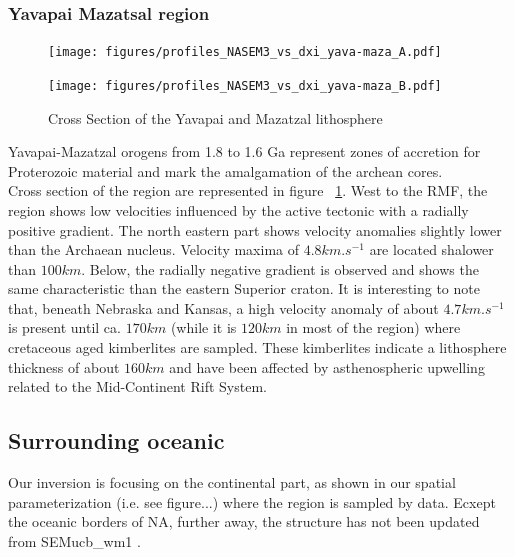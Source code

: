 \documentclass[12pt]{article}
\begin{document}
\subsubsection{Yavapai Mazatsal region}
	\begin{figure}
		\begin{minipage}{0.5\linewidth}
			\centerline{\texttt{[image: figures/profiles\_NASEM3\_vs\_dxi\_yava-maza\_A.pdf]}}
		\end{minipage}
		\hfill
		\begin{minipage}{0.5\linewidth}
			\centerline{\texttt{[image: figures/profiles\_NASEM3\_vs\_dxi\_yava-maza\_B.pdf]}}
		\end{minipage}

		\caption{Cross Section of the Yavapai and Mazatzal lithosphere}
		\label{yavacross}

	\end{figure}


	Yavapai-Mazatzal orogens from 1.8 to 1.6 Ga represent zones of accretion for Proterozoic material and mark the amalgamation of the archean cores. \citep{hoffman1988united} \\
	Cross section of the region are represented in figure ~\ref{yavacross}.
	West to the RMF, the region shows low velocities influenced by the active tectonic with a radially positive gradient. 
	The north eastern part shows velocity anomalies slightly lower than the Archaean nucleus. Velocity maxima of $4.8km.s^{-1}$ are located shalower than $100km$. 
	Below, the radially negative gradient is observed and shows the same characteristic than the eastern Superior craton. It is interesting to note that, beneath Nebraska and Kansas, a high velocity anomaly of about $4.7km.s^{-1}$ is present until ca. $170km$ (while it is $120km$ in most of the region) where cretaceous aged kimberlites are sampled. 
	These kimberlites indicate a lithosphere thickness of about $160km$ and have been affected by asthenospheric upwelling related to the Mid-Continent Rift System. \citep{griffin2004lithosphere}





\subsection{Surrounding oceanic}
	Our inversion is focusing on the continental part, as shown in our spatial parameterization (i.e. see figure...) where the region is sampled by data.
	Ecxept the oceanic borders of NA, further away, the structure has not been updated from SEMucb\_wm1 \citep{french2014whole}. 
\end{document}
